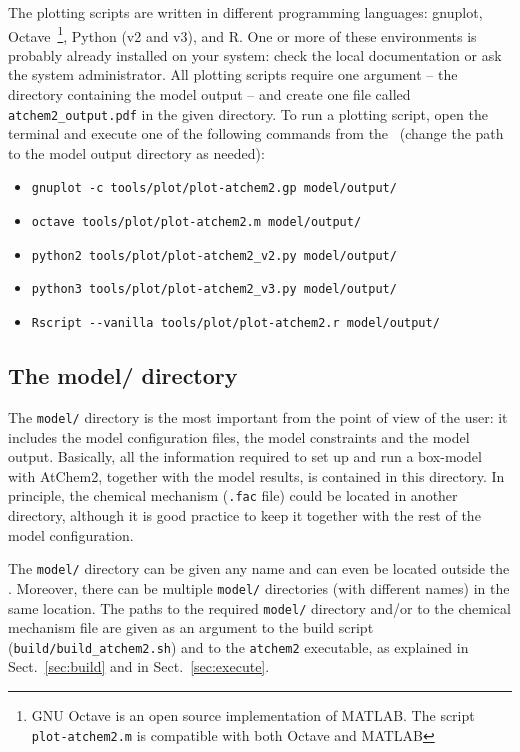 The plotting scripts are written in different programming languages:
gnuplot, Octave~\footnote{GNU Octave is an open source implementation
  of MATLAB. The script \texttt{plot-atchem2.m} is compatible with
  both Octave and MATLAB}, Python (v2 and v3), and R. One or more of
these environments is probably already installed on your system: check
the local documentation or ask the system administrator. All plotting
scripts require one argument -- the directory containing the model
output -- and create one file called \texttt{atchem2\_output.pdf} in
the given directory. To run a plotting script, open the terminal and
execute one of the following commands from the \maindir\ (change the
path to the model output directory as needed):

\begin{itemize}
\item \verb|gnuplot -c tools/plot/plot-atchem2.gp model/output/|
\item \verb|octave tools/plot/plot-atchem2.m model/output/|
\item \verb|python2 tools/plot/plot-atchem2_v2.py model/output/|
\item \verb|python3 tools/plot/plot-atchem2_v3.py model/output/|
\item \verb|Rscript --vanilla tools/plot/plot-atchem2.r model/output/|
\end{itemize}

\subsection{The model/ directory} \label{subsec:model-directory}

The \texttt{model/} directory is the most important from the point of
view of the user: it includes the model configuration files, the model
constraints and the model output. Basically, all the information
required to set up and run a box-model with AtChem2, together with the
model results, is contained in this directory. In principle, the
chemical mechanism (\texttt{.fac} file) could be located in another
directory, although it is good practice to keep it together with the
rest of the model configuration.

The \texttt{model/} directory can be given any name and can even be
located outside the \maindir. Moreover, there can be multiple
\texttt{model/} directories (with different names) in the same
location. The paths to the required \texttt{model/} directory and/or
to the chemical mechanism file are given as an argument to the build
script (\texttt{build/build\_atchem2.sh}) and to the \texttt{atchem2}
executable, as explained in Sect.~\ref{sec:build} and in
Sect.~\ref{sec:execute}.

